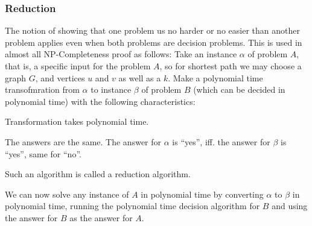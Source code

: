 \subsubsection{Reduction}
The notion of showing that one problem us no harder or no easier than another
problem applies even when both problems are decision problems. This is used in
almost all NP-Completeness proof as follows: Take an instance $\alpha$ of
problem $A$, that is, a specific input for the problem $A$, so for shortest path
we may choose a graph $G$, and vertices $u$ and $v$ as well as a $k$. Make a
polynomial time transofmration from $\alpha$ to instance $\beta$ of problem $B$
(which can be decided in polynomial time) with the following characteristics:
\begin{enumerate*}
\item Transformation takes polynomial time.
\item The answers are the same. The answer for $\alpha$ is ``yes'', iff. the
  answer for $\beta$ is ``yes'', same for ``no''.
\end{enumerate*}
Such an algorithm is called a reduction algorithm.

We can now solve any instance of $A$ in polynomial time by converting $\alpha$
to $\beta$ in polynomial time, running the polynomial time decision algorithm
for $B$ and using the answer for $B$ as the answer for $A$.


